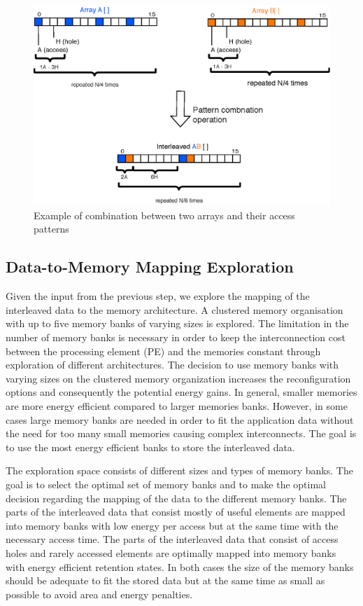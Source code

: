 \documentclass[prodmode,acmtecs]{acmsmall}
\begin{document}
\begin{figure}
\centering
	\includegraphics[scale = 0.6]{Images/Algebra.eps} 
	\caption{Example of combination between two arrays and their access patterns}
	\label{fig:algebra}
\end{figure}

\subsection{Data-to-Memory Mapping Exploration}

Given the input from the previous step, we explore the mapping of the interleaved data to the memory architecture.
A clustered memory organisation with up to five memory banks of varying sizes is explored. 
The limitation in the number of memory banks is necessary in order to keep the interconnection cost between the processing element (PE) and the memories constant through exploration of different architectures. 
The decision to use memory banks with varying sizes on the clustered memory organization increases the reconfiguration options and consequently the potential energy gains. 
In general, smaller memories are more energy efficient compared to larger memories banks. 
However, in some cases large memory banks are needed in order to fit the application data without the need for too many small memories causing complex interconnects. 
The goal is to use the most energy efficient banks to store the interleaved data.

The exploration space consists of different sizes and types of memory banks.
The goal is to select the optimal set of memory banks and to make  the optimal decision regarding the mapping of the data to the different memory banks.
The parts of the interleaved data that consist mostly of useful elements are mapped into memory banks with low energy per access but at the same time with the necessary access time.
The parts of the interleaved data that consist of access holes and rarely accessed elements are optimally mapped into memory banks with energy efficient retention states.
In both cases the size of  the memory banks should be adequate to fit the stored data but at the same time as small as possible to avoid area and energy penalties.
\end{document}
